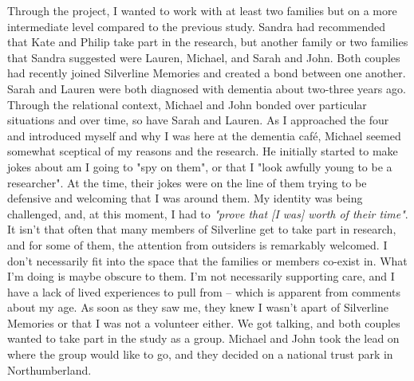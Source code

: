 Through the project, I wanted to work with at least two families but on a more intermediate level compared to the previous study. Sandra had recommended that Kate and Philip take part in the research, but another family or two families that Sandra suggested were Lauren, Michael, and Sarah and John. Both couples had recently joined Silverline Memories and created a bond between one another. Sarah and Lauren were both diagnosed with dementia about two-three years ago. Through the relational context, Michael and John bonded over particular situations and over time, so have Sarah and Lauren. As I approached the four and introduced myself and why I was here at the dementia café, Michael seemed somewhat sceptical of my reasons and the research. He initially started to make jokes about am I going to "spy on them", or that I "look awfully young to be a researcher". At the time, their jokes were on the line of them trying to be defensive and welcoming that I was around them. My identity was being challenged, and, at this moment, I had to \textit{"prove that [I was] worth of their time"}. It isn't that often that many members of Silverline get to take part in research, and for some of them, the attention from outsiders is remarkably welcomed. I don't necessarily fit into the space that the families or members co-exist in. What I'm doing is maybe obscure to them. I'm not necessarily supporting care, and I have a lack of lived experiences to pull from – which is apparent from comments about my age. As soon as they saw me, they knew I wasn't apart of Silverline Memories or that I was not a volunteer either. We got talking, and both couples wanted to take part in the study as a group. Michael and John took the lead on where the group would like to go, and they decided on a national trust park in Northumberland.


